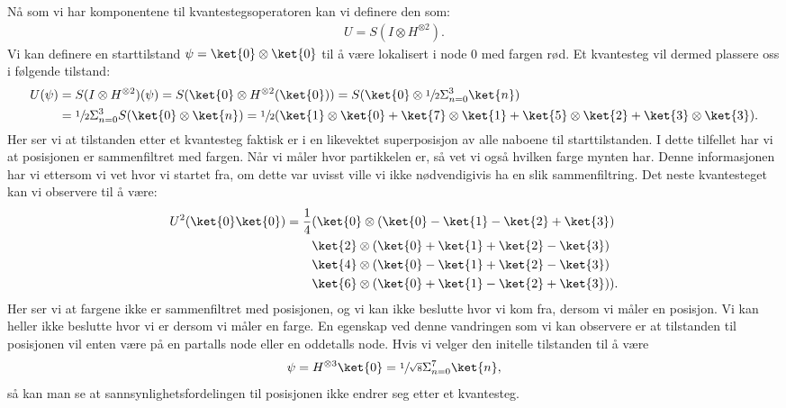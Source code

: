         Nå som vi har komponentene til kvantestegsoperatoren kan vi definere den som:
        \begin{align*}
            U=S(I\otimes H^{\otimes 2}).
        \end{align*}
        Vi kan definere en starttilstand $\psi = \ket{0}\otimes\ket{0}$ til å være lokalisert i node $0$ med fargen rød. Et kvantesteg vil dermed plassere oss i følgende tilstand:
        \begin{align*}
            U(\psi) & =S(I\otimes H^{\otimes 2})(\psi)=S(\ket{0}\otimes H^{\otimes 2}(\ket{0}))=S(\ket{0}\otimes \sfrac{1}{2}\Sigma_{n=0}^3\ket{n}) \\
            & =\sfrac{1}{2}\Sigma_{n=0}^3S(\ket{0}\otimes\ket{n}) = \sfrac{1}{2}(\ket{1}\otimes\ket{0}+\ket{7}\otimes\ket{1}+\ket{5}\otimes\ket{2}+\ket{3}\otimes\ket{3}).
        \end{align*}
        Her ser vi at tilstanden etter et kvantesteg faktisk er i en likevektet superposisjon av alle naboene til starttilstanden. I dette tilfellet har vi at posisjonen er sammenfiltret med fargen. Når vi måler hvor partikkelen er, så vet vi også hvilken farge mynten har. Denne informasjonen har vi ettersom vi vet hvor vi startet fra, om dette var uvisst ville vi ikke nødvendigivis ha en slik sammenfiltring. Det neste kvantesteget kan vi observere til å være:
        \begin{align*}
            U^2(\ket{0}\ket{0})=\frac{1}{4} & (\ket{0}\otimes (\ket{0}-\ket{1}-\ket{2}+\ket{3}) \\
            & \ket{2}\otimes (\ket{0}+\ket{1}+\ket{2}-\ket{3}) \\
            & \ket{4}\otimes (\ket{0}-\ket{1}+\ket{2}-\ket{3}) \\
            & \ket{6} \otimes (\ket{0} + \ket{1} -\ket{2} + \ket{3})).
        \end{align*}
        Her ser vi at fargene ikke er sammenfiltret med posisjonen, og vi kan ikke beslutte hvor vi kom fra, dersom vi måler en posisjon. Vi kan heller ikke beslutte hvor vi er dersom vi måler en farge. En egenskap ved denne vandringen som vi kan observere er at tilstanden til posisjonen vil enten være på en partalls node eller en oddetalls node. Hvis vi velger den initelle tilstanden til å være 
        \begin{align*}
            \psi = H^{\otimes 3}\ket{0}=\sfrac{1}{\sqrt{8}}\Sigma_{n=0}^7\ket{n},
        \end{align*}
        så kan man se at sannsynlighetsfordelingen til posisjonen ikke endrer seg etter et kvantesteg.

